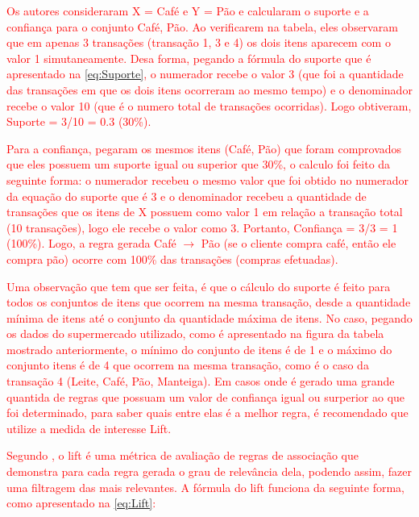 \textcolor{red}{Os autores  consideraram X = {Café} e Y = {Pão} e calcularam o suporte e a confiança para o conjunto {Café, Pão}. Ao verificarem na tabela, eles observaram que em apenas 3 transações (transação 1, 3 e 4) os dois itens aparecem com o valor 1 simutaneamente. Desa forma, pegando a fórmula do suporte que é apresentado na \autoref{eq:Suporte}, o numerador recebe o valor 3 (que foi a quantidade das transações em que os dois itens ocorreram ao mesmo tempo) e o denominador recebe o valor 10 (que é o numero total de transações ocorridas). Logo obtiveram, Suporte = 3/10 = 0.3 (30\%).}

\par
\textcolor{red}{Para a confiança,  pegaram os mesmos itens (Café, Pão) que foram comprovados que eles possuem um suporte igual ou superior que 30\%, o calculo foi feito da seguinte forma: o numerador recebeu o mesmo valor que foi obtido no numerador da equação do suporte que é 3 e o denominador recebeu a quantidade de transações que os itens de X possuem como valor 1 em relação a transação total (10 transações), logo ele recebe o valor como 3. Portanto, Confiança = 3/3 = 1 (100\%). Logo, a regra gerada Café $\rightarrow$ Pão (se o cliente compra café, então ele compra pão) ocorre com 100\% das transações (compras efetuadas).}

\par
\textcolor{red}{Uma observação que tem que ser feita, é que o cálculo do suporte é feito para todos os conjuntos de itens que ocorrem na mesma transação, desde a quantidade mínima de itens até o conjunto da quantidade máxima de itens. No caso, pegando os dados do supermercado utilizado, como é apresentado na figura da tabela mostrado anteriormente, o mínimo do conjunto de itens é de 1 e o máximo do conjunto itens é de 4 que ocorrem na mesma transação, como é o caso da transação 4 (Leite, Café, Pão, Manteiga). Em casos onde é gerado uma grande quantida de regras que possuam um valor de confiança igual ou surperior ao que foi determinado, para saber quais entre elas é a melhor regra, é recomendado que utilize a medida de interesse Lift.}

\par
\textcolor{red}{Segundo , o lift é uma métrica de avaliação de regras de associação que demonstra para cada regra gerada o grau de relevância dela, podendo assim, fazer uma filtragem das mais relevantes. A fórmula do lift funciona da seguinte forma, como apresentado na \autoref{eq:Lift}:}


